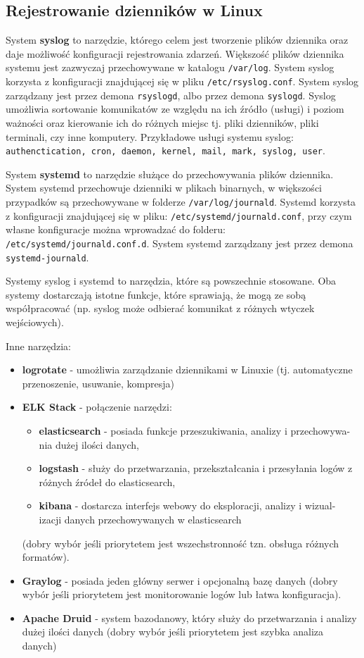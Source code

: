 \documentclass{article}
\begin{document}
\subsection{Rejestrowanie dzienników w Linux}
System \textbf{syslog} to narzędzie, którego celem jest tworzenie plików dziennika oraz daje możliwość konfiguracji rejestrowania zdarzeń. Większość plików dziennika systemu jest zazwyczaj przechowywane w katalogu \texttt{/var/log}. System syslog korzysta z konfiguracji znajdującej się w pliku \texttt{/etc/rsyslog.conf}. System syslog zarządzany jest przez demona \texttt{rsyslogd}, albo przez demona \texttt{syslogd}. Syslog umożliwia sortowanie komunikatów ze względu na ich źródło (usługi) i poziom ważności oraz kierowanie ich do różnych miejsc tj. pliki dzienników, pliki terminali, czy inne komputery. Przykładowe usługi systemu syslog: \texttt{authenctication, cron, daemon, kernel, mail, mark, syslog, user}.

System \textbf{systemd} to narzędzie służące do przechowywania plików dziennika. System systemd przechowuje dzienniki w plikach binarnych, w większości przypadków są przechowywane w folderze \texttt{/var/log/journald}. Systemd korzysta z konfiguracji znajdującej się w pliku: \texttt{/etc/systemd/journald.conf}, przy czym własne konfiguracje można wprowadzać do folderu: \texttt{/etc/systemd/journald.conf.d}.  System systemd zarządzany jest przez demona \texttt{systemd-journald}.

Systemy syslog i systemd to narzędzia, które są powszechnie stosowane. Oba systemy dostarczają istotne funkcje, które sprawiają, że mogą ze sobą współpracować (np. syslog może odbierać komunikat z różnych wtyczek wejściowych).

Inne narzędzia:
\begin{itemize}
    \item \textbf{logrotate} - umożliwia zarządzanie dziennikami w Linuxie (tj. automatyczne przenoszenie, usuwanie, kompresja)
    \item \textbf{ELK Stack} - połączenie narzędzi:
    \begin{itemize}
        \item \textbf{elasticsearch} - posiada funkcje przeszukiwania, analizy i przechowywa- nia dużej ilości danych,
        \item \textbf{logstash} - służy do przetwarzania, przekształcania i przesyłania logów z różnych źródeł do elasticsearch,
        \item \textbf{kibana} - dostarcza interfejs webowy do eksploracji, analizy i wizual- izacji danych przechowywanych w elasticsearch
    \end{itemize}
    (dobry wybór jeśli priorytetem jest wszechstronność tzn. obsługa różnych formatów).
    \item \textbf{Graylog} - posiada jeden główny serwer i opcjonalną bazę danych (dobry wybór jeśli priorytetem jest monitorowanie logów lub łatwa konfiguracja).
    \item \textbf{Apache Druid} - system bazodanowy, który służy do przetwarzania i analizy dużej ilości danych (dobry wybór jeśli priorytetem jest szybka analiza danych) 
\end{itemize}
\end{document}
